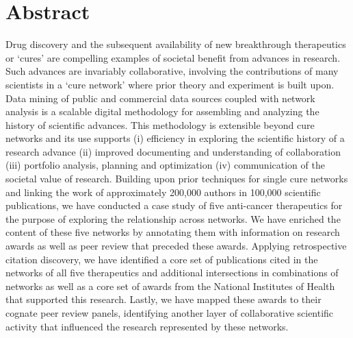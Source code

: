 \documentclass[10pt,letterpaper]{article}
\begin{document}
\section*{Abstract}

Drug discovery and the subsequent availability of new breakthrough therapeutics or `cures' are compelling examples of societal benefit from advances in research. Such advances are invariably collaborative, involving the contributions of many scientists in a `cure network' where prior theory and experiment is built upon. Data mining of public and commercial data sources coupled with network analysis is a scalable digital methodology for assembling and analyzing the history of scientific advances. This methodology is extensible beyond cure networks and its use supports (i) efficiency in  exploring  the scientific history of a research advance (ii) improved documenting and understanding of collaboration (iii) portfolio analysis, planning and optimization (iv) communication of the societal value of research. Building upon prior techniques for single cure networks and linking the work of approximately 200,000 authors in 100,000 scientific publications, we have conducted a case study of five anti-cancer therapeutics for the purpose of exploring the relationship across networks. We have enriched the content of these five networks by annotating them with information on research awards as well as peer review that preceded these awards. Applying retrospective citation discovery, we have identified a core set of publications cited in the networks of all five therapeutics and additional intersections in combinations of networks as well as a core set of awards from the National Institutes of Health that supported this research. Lastly, we have mapped these awards to their cognate peer review panels, identifying another layer of collaborative scientific activity that influenced the research represented by these networks. 

\end{document}
